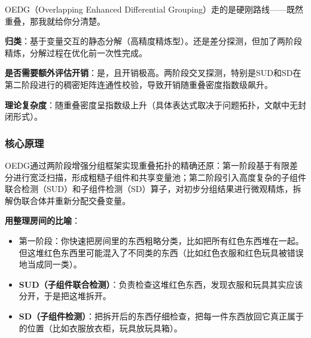 OEDG（Overlapping Enhanced Differential Grouping）走的是硬刚路线——既然重叠，那我就给你分清楚。

\textbf{归类}：基于变量交互的静态分解（高精度精炼型）。还是差分探测，但加了两阶段精炼，分解过程在优化前一次性完成。

\textbf{是否需要额外评估开销}：是，且开销极高。两阶段交叉探测，特别是SUD和SD在第二阶段进行的稠密矩阵连通性校验，导致开销随重叠密度指数级飙升。

\textbf{理论复杂度}：随重叠密度呈指数级上升（具体表达式取决于问题拓扑，文献中无封闭形式）。

\subsubsection*{核心原理}
OEDG通过两阶段增强分组框架实现重叠拓扑的精确还原：第一阶段基于有限差分进行宽泛扫描，形成粗糙子组件和共享变量池；第二阶段引入高度复杂的子组件联合检测（SUD）和子组件检测（SD）算子，对初步分组结果进行微观精炼，拆解伪联合体并重新分配交叠变量。

\textbf{用整理房间的比喻}：
\begin{itemize}
    \item 第一阶段：你快速把房间里的东西粗略分类，比如把所有红色东西堆在一起。但这堆红色东西里可能混入了不同类的东西（比如红色衣服和红色玩具被错误地当成同一类）。
    \item \textbf{SUD（子组件联合检测）}：负责检查这堆红色东西，发现衣服和玩具其实应该分开，于是把这堆拆开。
    \item \textbf{SD（子组件检测）}：把拆开后的东西仔细检查，把每一件东西放回它真正属于的位置（比如衣服放衣柜，玩具放玩具箱）。
\end{itemize}

